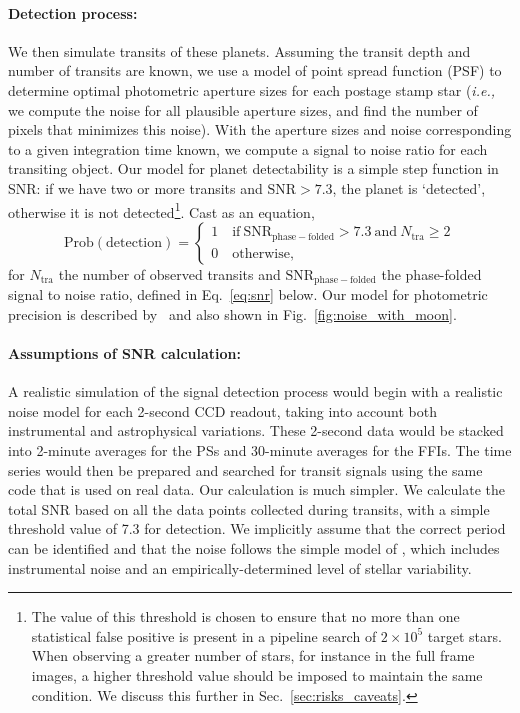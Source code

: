 \paragraph{Detection process:}
We then simulate transits of these planets.  Assuming the transit
depth and number of transits are known, we use a model of \tesss point
spread function (PSF) to determine optimal photometric aperture sizes
for each postage stamp star (\textit{i.e.,} we compute the noise for
all plausible aperture sizes, and find the number of pixels that
minimizes this noise).  With the aperture sizes and noise
corresponding to a given integration time known, we compute a signal
to noise ratio for each transiting object.  Our model for planet
detectability is a simple step function in SNR: if we have two or more
transits and $\text{SNR} > 7.3$, the planet is `detected', otherwise
it is not detected\footnote{The value of this threshold is chosen to
  ensure that no more than one statistical false positive is present in
  a pipeline search of $2\times10^5$ target stars. When observing a
  greater number of stars, for instance in the full frame images, 
  a higher threshold value should be imposed to maintain the same condition. We
  discuss this further in Sec.~\protect\ref{sec:risks_caveats}.}. 
Cast as an equation,
\begin{equation}
\mathrm{Prob(detection)}=\begin{cases}
1 \quad \mathrm{if\ SNR_{phase-folded}} > 7.3\ \mathrm{and}\ 
	N_\mathrm{tra} \geq 2 \\
0 \quad \mathrm{otherwise},
\end{cases}
\label{eq:detection_criterion}
\end{equation}
for $N_\mathrm{tra}$ the number of observed transits and 
$\mathrm{SNR_{phase-folded}}$ the phase-folded signal to noise ratio, defined 
in Eq.~\ref{eq:snr} below.
Our model for \tesss photometric precision is described 
by~ and also shown in
Fig.~\ref{fig:noise_with_moon}.

\paragraph{Assumptions of SNR calculation:}
A realistic simulation of the signal detection process
would begin with a realistic noise model for each 2-second CCD readout, taking into account both
instrumental and astrophysical variations. These 2-second data would be stacked into 2-minute
averages for the PSs and 30-minute averages for the FFIs. The time series would then be prepared and searched for transit signals using the same code that is used on real data.
Our calculation is much simpler. We calculate the total SNR based on all the
data points collected during transits, with a simple threshold value of 7.3 for detection.
We implicitly assume that the correct period can be identified and that the noise follows
the simple model of \citetalias{Sullivan_2015}, which includes instrumental noise
and an empirically-determined level of stellar variability.


